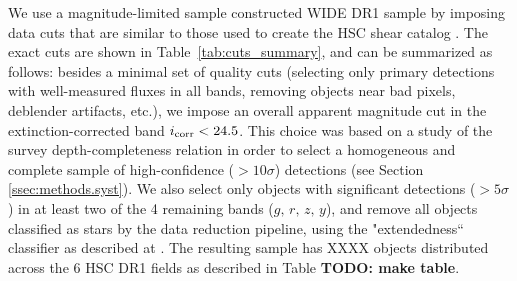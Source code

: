 \documentclass[a4paper,11pt]{article}
\newcommand{\todo}[1]{{\bf TODO: #1}}
\begin{document}
  We use a magnitude-limited sample constructed WIDE DR1 sample by imposing data cuts that are similar to those used to create the HSC shear catalog \cite{2018PASJ...70S..25M}. The exact cuts are shown in Table~\ref{tab:cuts_summary}, and can be summarized as follows: besides a minimal set of quality cuts (selecting only primary detections with well-measured fluxes in all bands, removing objects near bad pixels, deblender artifacts, etc.), we impose an overall apparent magnitude cut in the extinction-corrected band $i_{\rm corr}<24.5$. This choice was based on a study of the survey depth-completeness relation in order to select a homogeneous and complete sample of high-confidence ($>10\sigma$) detections (see Section \ref{ssec:methods.syst}). We also select only objects with significant detections ($>5\sigma$) in at least two of the 4 remaining bands ($g,\,r,\,z,\,y$), and remove all objects classified as stars by the data reduction pipeline, using the "extendedness`` classifier as described at \citet{2018PASJ...70S...5B}. The resulting sample has XXXX objects distributed across the 6 HSC DR1 fields as described in Table \todo{make table}.
  
\end{document}
